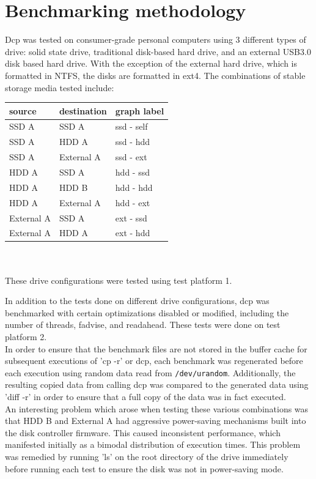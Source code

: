 \documentclass[12pt]{article}
\begin{document}
\section{Benchmarking methodology}
Dcp was tested on consumer-grade personal computers using 3 different types
of drive: solid state drive, traditional disk-based hard drive, and
an external USB3.0 disk based hard drive. With the exception of the external
hard drive, which is formatted in NTFS, the disks are formatted in ext4.
The combinations of stable storage media tested include:\\
\begin{tabular}{|l|l|l|}
  \hline
  source  & destination & graph label \\
  \hline
  SSD A   & SSD A       & ssd - self  \\
  SSD A   & HDD A       & ssd - hdd   \\
  SSD A   & External A  & ssd - ext   \\
  HDD A   & SSD A       & hdd - ssd   \\
  HDD A   & HDD B       & hdd - hdd   \\
  HDD A   & External A  & hdd - ext   \\
  External A & SSD A    & ext - ssd   \\
  External A & HDD A    & ext - hdd   \\
  \hline
\end{tabular} \\\\

\noindent
These drive configurations were tested using test platform 1.

In addition to the tests done on different drive configurations,
dcp was benchmarked with certain optimizations disabled or modified, including
the number of threads, fadvise, and readahead. These tests were done on test platform 2.\\

In order to ensure that the benchmark files are not stored in the buffer cache
for subsequent executions of 'cp -r' or dcp, each benchmark was regenerated
before each execution using random data read from \texttt{/dev/urandom}.
Additionally, the resulting copied data from calling dcp
was compared to the generated data using 'diff -r' in order to
ensure that a full copy of the data was in fact executed.\\

An interesting problem which arose when testing these various combinations
was that HDD B and External A had aggressive power-saving mechanisms built into the
disk controller firmware. This caused inconsistent performance, which
manifested initially as a bimodal distribution of execution times. This
problem was remedied by running 'ls' on the root directory of the
drive immediately before running each test to ensure the disk was not in power-saving
mode.\\
\end{document}
